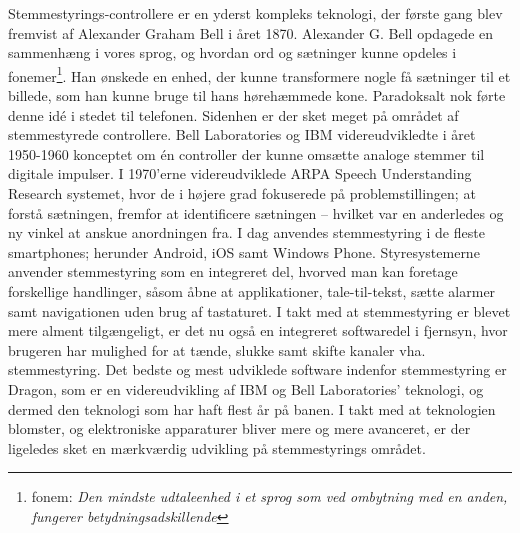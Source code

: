 \label{sec:stemmestyring}
Stemmestyrings-controllere er en yderst kompleks teknologi, der første gang blev fremvist af Alexander Graham Bell i året 1870. Alexander G. Bell opdagede en sammenhæng i vores sprog, og hvordan ord og sætninger kunne opdeles i fonemer\footnote{fonem: \textit{Den mindste udtaleenhed i et sprog som ved ombytning med en anden, fungerer betydningsadskillende}\cite{DDOfonem}}. Han ønskede en enhed, der kunne transformere nogle få sætninger til et billede, som han kunne bruge til hans hørehæmmede kone. Paradoksalt nok førte denne idé i stedet til telefonen\cite{SpeechGUIDE}. Sidenhen er der sket meget på området af stemmestyrede controllere. Bell Laboratories og IBM videreudvikledte i året 1950-1960 konceptet om én controller der kunne omsætte analoge stemmer til digitale impulser. I 1970’erne videreudviklede ARPA Speech Understanding Research systemet, hvor de i højere grad fokuserede på problemstillingen; at forstå sætningen, fremfor at identificere sætningen – hvilket var en anderledes og ny vinkel at anskue anordningen fra. I dag anvendes stemmestyring i de fleste smartphones; herunder Android, iOS samt Windows Phone. Styresystemerne anvender stemmestyring som en integreret del, hvorved man kan foretage forskellige handlinger, såsom åbne at applikationer, tale-til-tekst, sætte alarmer samt navigationen uden brug af tastaturet. I takt med at stemmestyring er blevet mere alment tilgængeligt, er det nu også en integreret softwaredel i fjernsyn\cite{SpeechSamsung}, hvor brugeren har mulighed for at tænde, slukke samt skifte kanaler vha. stemmestyring. Det bedste og mest udviklede software indenfor stemmestyring er Dragon, som er en videreudvikling af IBM og Bell Laboratories' teknologi, og dermed den teknologi som har haft flest år på banen.\cite{SpeechMIT} I takt med at teknologien blomster, og elektroniske apparaturer bliver mere og mere avanceret, er der ligeledes sket en mærkværdig udvikling på stemmestyrings området. 


